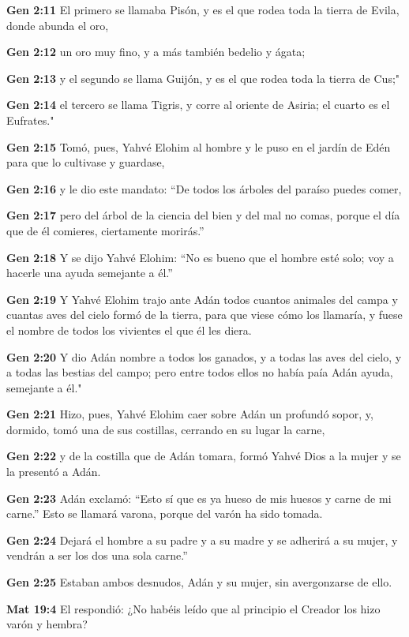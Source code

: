 \textbf{Gen 2:11} El primero se llamaba Pisón, y es el que rodea toda la tierra de Evila, donde abunda el oro, 

\textbf{Gen 2:12} un oro muy fino, y a más también bedelio y ágata; 

\textbf{Gen 2:13} y el segundo se llama Guijón, y es el que rodea toda la tierra de Cus;" 

\textbf{Gen 2:14} el tercero se llama Tigris, y corre al oriente de Asiria; el cuarto es el Eufrates." 

\textbf{Gen 2:15} Tomó, pues, Yahvé Elohim al hombre y le puso en el jardín de Edén para que lo cultivase y guardase, 

\textbf{Gen 2:16} y le dio este mandato: “De todos los árboles del paraíso puedes comer, 

\textbf{Gen 2:17} pero del árbol de la ciencia del bien y del mal no comas, porque el día que de él comieres, ciertamente morirás.” 

\textbf{Gen 2:18} Y se dijo Yahvé Elohim: “No es bueno que el hombre esté solo; voy a hacerle una ayuda semejante a él.” 

\textbf{Gen 2:19} Y Yahvé Elohim trajo ante Adán todos cuantos animales del campa y cuantas aves del cielo formó de la tierra, para que viese cómo los llamaría, y fuese el nombre de todos los vivientes el que él les diera. 

\textbf{Gen 2:20} Y dio Adán nombre a todos los ganados, y a todas las aves del cielo, y a todas las bestias del campo; pero entre todos ellos no había paía Adán ayuda, semejante a él." 

\textbf{Gen 2:21} Hizo, pues, Yahvé Elohim caer sobre Adán un profundó sopor, y, dormido, tomó una de sus costillas, cerrando en su lugar la carne, 

\textbf{Gen 2:22} y de la costilla que de Adán tomara, formó Yahvé Dios a la mujer y se la presentó a Adán. 

\textbf{Gen 2:23} Adán exclamó: “Esto sí que es ya hueso de mis huesos y carne de mi carne.” Esto se llamará varona, porque del varón ha sido tomada. 

\textbf{Gen 2:24} Dejará el hombre a su padre y a su madre y se adherirá a su mujer, y vendrán a ser los dos una sola carne.” 

\textbf{Gen 2:25} Estaban ambos desnudos, Adán y su mujer, sin avergonzarse de ello. 

\textbf{Mat 19:4} El respondió: ¿No habéis leído que al principio el Creador los hizo varón y hembra? 

